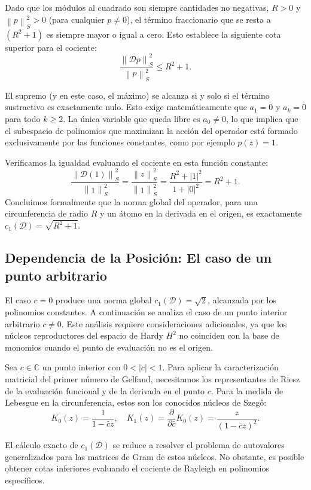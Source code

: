 \documentclass[12pt,a4paper]{article}
\theoremstyle{definition}
\theoremstyle{remark}
\newcommand{\C}{\mathbb{C}}
\newcommand{\norm}[1]{\left\| #1 \right\|_S}
\newcommand{\abs}[1]{\left| #1 \right|}
\newcommand{\D}{\mathcal{D}}
\begin{document}
Dado que los módulos al cuadrado son siempre cantidades no negativas, $R>0$ y $\norm{p}^2 > 0$ (para cualquier $p \neq 0$), el término fraccionario que se resta a $(R^2 + 1)$ es siempre mayor o igual a cero. Esto establece la siguiente cota superior para el cociente:
$$ \frac{\norm{\D p}^2}{\norm{p}^2} \le R^2 + 1. $$

El supremo (y en este caso, el máximo) se alcanza si y solo si el término sustractivo es exactamente nulo. Esto exige matemáticamente que $a_1 = 0$ y $a_k = 0$ para todo $k \ge 2$. La única variable que queda libre es $a_0 \neq 0$, lo que implica que el subespacio de polinomios que maximizan la acción del operador está formado exclusivamente por las funciones constantes, como por ejemplo $p(z) = 1$.

Verificamos la igualdad evaluando el cociente en esta función constante:
$$ \frac{\norm{\D(1)}^2}{\norm{1}^2} = \frac{\norm{z}^2}{\norm{1}^2} = \frac{R^2 + \abs{1}^2}{1 + \abs{0}^2} = R^2 + 1. $$
Concluimos formalmente que la norma global del operador, para una circunferencia de radio $R$ y un átomo en la derivada en el origen, es exactamente $c_1(\D) = \sqrt{R^2 + 1}$.

\subsection{Dependencia de la Posición: El caso de un punto arbitrario}

El caso $c=0$ produce una norma global $c_1(\D) = \sqrt{2}$, alcanzada por los polinomios constantes. A continuación se analiza el caso de un punto interior arbitrario $c \neq 0$. Este análisis requiere consideraciones adicionales, ya que los núcleos reproductores del espacio de Hardy $H^2$ no coinciden con la base de monomios cuando el punto de evaluación no es el origen.

Sea $c \in \C$ un punto interior con $0 < \abs{c} < 1$. Para aplicar la caracterización matricial del primer número de Gelfand, necesitamos los representantes de Riesz de la evaluación funcional y de la derivada en el punto $c$. Para la medida de Lebesgue en la circunferencia, estos son los conocidos núcleos de Szegő:
\begin{equation}
    K_0(z) = \frac{1}{1 - \bar{c}z}, \quad K_1(z) = \frac{\partial}{\partial \bar{c}} K_0(z) = \frac{z}{(1 - \bar{c}z)^2}.
\end{equation}

El cálculo exacto de $c_1(\D)$ se reduce a resolver el problema de autovalores generalizados para las matrices de Gram de estos núcleos. No obstante, es posible obtener cotas inferiores evaluando el cociente de Rayleigh en polinomios específicos.
\end{document}
